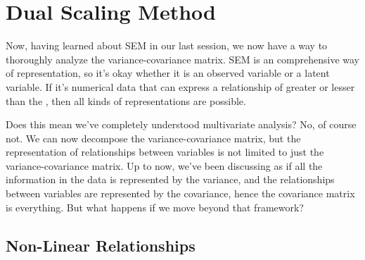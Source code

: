 \documentclass{ltjsbook}
\begin{document}
\chapter{Dual Scaling Method}
\label{x14_DualScaling}


Now, having learned about SEM in our last session, we now have a way to thoroughly analyze the variance-covariance matrix. SEM is an comprehensive way of representation, so it's okay whether it is an observed variable or a latent variable. If it's numerical data that can express a relationship of greater or lesser than the , then all kinds of representations are possible.

Does this mean we've completely understood multivariate analysis? No, of course not. We can now decompose the variance-covariance matrix, but the representation of relationships between variables is not limited to just the variance-covariance matrix.
Up to now, we've been discussing as if all the information in the data is represented by the variance, and the relationships between variables are represented by the covariance, hence the covariance matrix is everything. But what happens if we move beyond that framework?

\section{Non-Linear Relationships}
\end{document}
